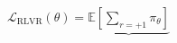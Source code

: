 \documentclass[preview]{standalone}
\begin{document}
\begin{align*}
\mathcal{L}_{\mathrm{RLVR}}(\theta) =
            \underbrace{\mathbb{E}\!\left[\sum_{r=+1}\pi_\theta\right]}_{\text{}}
\end{align*}
\end{document}

